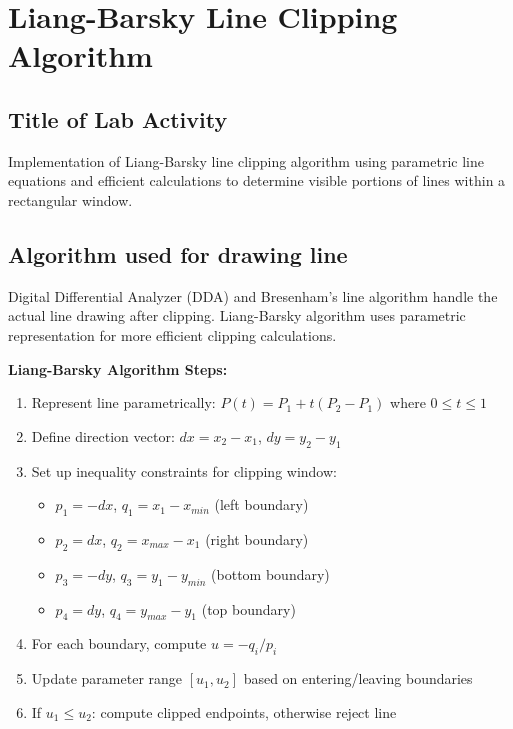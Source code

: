 \documentclass[12pt,a4paper]{article}
\begin{document}
\newpage
\section{Liang-Barsky Line Clipping Algorithm}

\subsection{Title of Lab Activity}
Implementation of Liang-Barsky line clipping algorithm using parametric line equations and efficient calculations to determine visible portions of lines within a rectangular window.

\subsection{Algorithm used for drawing line}
Digital Differential Analyzer (DDA) and Bresenham's line algorithm handle the actual line drawing after clipping. Liang-Barsky algorithm uses parametric representation for more efficient clipping calculations.

\textbf{Liang-Barsky Algorithm Steps:}
\begin{enumerate}
    \item Represent line parametrically: $P(t) = P_1 + t(P_2 - P_1)$ where $0 \leq t \leq 1$
    \item Define direction vector: $dx = x_2 - x_1$, $dy = y_2 - y_1$
    \item Set up inequality constraints for clipping window:
    \begin{itemize}
        \item $p_1 = -dx$, $q_1 = x_1 - x_{min}$ (left boundary)
        \item $p_2 = dx$, $q_2 = x_{max} - x_1$ (right boundary)
        \item $p_3 = -dy$, $q_3 = y_1 - y_{min}$ (bottom boundary)
        \item $p_4 = dy$, $q_4 = y_{max} - y_1$ (top boundary)
    \end{itemize}
    \item For each boundary, compute $u = -q_i / p_i$
    \item Update parameter range $[u_1, u_2]$ based on entering/leaving boundaries
    \item If $u_1 \leq u_2$: compute clipped endpoints, otherwise reject line
\end{enumerate}
\end{document}
